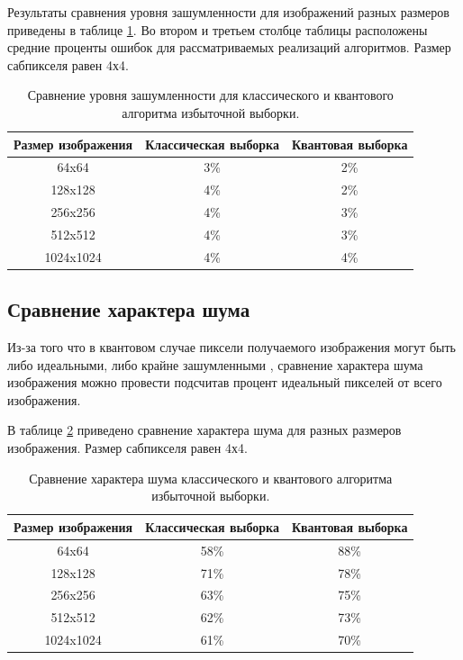 Результаты сравнения уровня зашумленности для изображений разных размеров приведены в таблице \ref{tab:noise}. Во втором и третьем столбце таблицы расположены средние проценты ошибок для рассматриваемых реализаций алгоритмов. Размер сабпикселя равен 4х4.

\begin{table}[h!]
	\caption{Сравнение уровня зашумленности для классического и квантового алгоритма избыточной выборки.}
	\label{tab:noise}
	\begin{center}
		\begin{tabular}{|c | c | c|} 
			\hline
			Размер изображения & Классическая выборка & Квантовая выборка \\  
			\hline
			64x64 & 3\% & 2\%  \\
			\hline
			128x128 & 4\% & 2\% \\
			\hline
			256x256 & 4\% & 3\% \\
			\hline
			512x512 & 4\% & 3\% \\
			\hline
			1024x1024 & 4\%  & 4\% \\
			\hline
		\end{tabular}
	\end{center}
\end{table}

\subsection{Сравнение характера шума}

Из-за того что в квантовом случае пиксели получаемого изображения могут быть либо идеальными, либо крайне зашумленными \cite{PQC-classic}, сравнение характера шума  изображения можно провести подсчитав процент идеальный пикселей от всего изображения. 

В таблице \ref{tab:noise_02} приведено сравнение характера шума для разных размеров изображения. Размер сабпикселя равен 4х4.

\begin{table}[h!]
	\caption{Сравнение характера шума классического и квантового алгоритма избыточной выборки.}
	\label{tab:noise_02}
	\begin{center}
		\begin{tabular}{|c| c | c|} 
			\hline
			Размер изображения & Классическая выборка & Квантовая выборка \\  
			\hline
			64x64 & 58\% & 88\%  \\
			\hline
			128x128 & 71\% & 78\% \\
			\hline
			256x256 & 63\% & 75\% \\
			\hline
			512x512 & 62\% & 73\% \\
			\hline
			1024x1024 & 61\% & 70\% \\
			\hline
		\end{tabular}
	\end{center}
\end{table}

